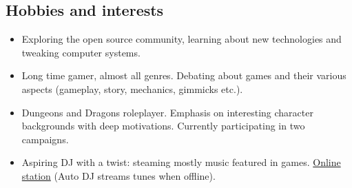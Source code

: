 \documentclass[a4paper,oneside,10pt]{article}
\begin{document}
\subsection*{Hobbies and interests}

	\begin{itemize}

		\item Exploring the open source community, learning about new technologies and tweaking computer systems.

		\item Long time gamer, almost all genres. Debating about games and their various aspects (gameplay, story, mechanics, gimmicks etc.). 

		\item Dungeons and Dragons roleplayer. Emphasis on interesting character backgrounds with deep motivations. Currently participating in two campaigns.
		
		\item Aspiring DJ with a twist: steaming mostly music featured in games. \href{https://zeno.fm/the-hermit}{Online station} (Auto DJ streams tunes when offline).

	\end{itemize}
\end{document}

